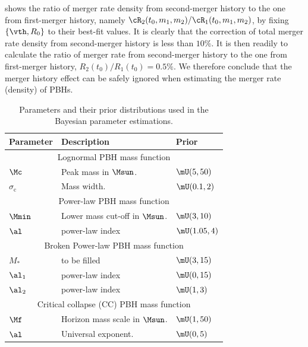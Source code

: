 \documentclass[twocolumn]{aastex631}
\def\[{\left[}
\begin{document}
 shows the ratio of merger rate density from second-merger history
to the one from first-merger history, namely 
$\cR_2(t_0, m_1, m_2)/\cR_1(t_0, m_1, m_2)$, by fixing $\{\vth, R_0\}$ to their best-fit values.
It is clearly that the correction of total merger rate density from 
second-merger history is less than $10\%$.
It is then readily to calculate the ratio of merger rate from 
second-merger history to the one from first-merger history, 
$R_2(t_0)/R_1(t_0) = 0.5\%$.
We therefore conclude that the merger history effect can be safely ignored
when estimating the merger rate (density) of PBHs.

\begin{table}[htbp!]
	\centering
	\begin{tabular}{lll}
		\hline\hline
		\textbf{Parameter\quad} & \textbf{Description} & \textbf{Prior} \\
		\hline
		\multicolumn{3}{c}{Lognormal PBH mass function} \\[1pt]
		$\Mc$ & Peak mass in $\Msun$. & $\mU(5, 50)$\\
		$\sigma_\mathrm{c}$ & Mass width. & $\mU(0.1, 2)$\\
		\hline
		\multicolumn{3}{c}{Power-law PBH mass function} \\[1pt]
		$\Mmin$ & Lower mass cut-off in $\Msun$. & $\mU(3, 10)$\\
		$\al$ & power-law index & $\mU(1.05, 4)$\\
		\hline
		\multicolumn{3}{c}{Broken Power-law PBH mass function} \\[1pt]
		$M_*$ & to be filled & $\mU(3, 15)$\\
		$\al_1$ & power-law index & $\mU(0, 15)$\\
		$\al_2$ & power-law index & $\mU(1, 3)$\\
		\hline
		\multicolumn{3}{c}{Critical collapse (CC) PBH mass function} \\[1pt]
		$\Mf$ & Horizon mass scale in $\Msun$. & $\mU(1, 50)$\\
		$\al$ & Universal exponent. & $\mU(0, 5)$\\
		\hline
	\end{tabular}
	\label{tab:priors}
	\caption{Parameters and their prior distributions used in the Bayesian parameter estimations.}
\end{table}
\end{document}
